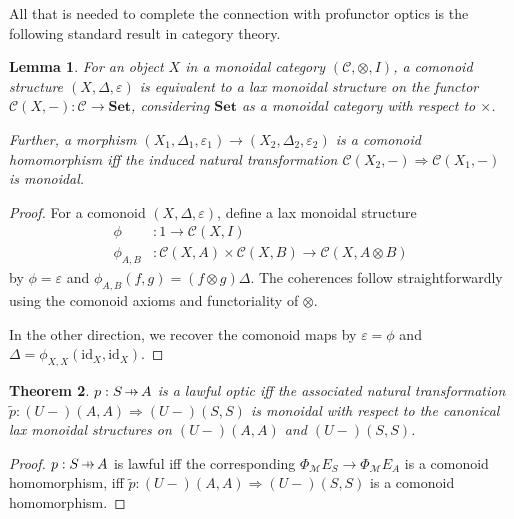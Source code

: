 \documentclass[11pt,letterpaper]{article}
\theoremstyle{plain}
\newtheorem{theorem}{Theorem}[subsection]
\newtheorem{lemma}[theorem]{Lemma}
\theoremstyle{definition}
\newcommand{\C}{\mathscr{C}}
\newcommand{\M}{\mathscr{M}}
\newcommand{\Pastro}{\Phi}
\newcommand{\Set}{\mathbf{Set}}
\newcommand{\id}{\mathrm{id}}
\newcommand{\hto}{\ensuremath{\,\mathaccent\shortmid\rightarrow\,}}
\begin{document}
All that is needed to complete the connection with profunctor optics is the following standard result in category theory.

\begin{lemma}
  For an object $X$ in a monoidal category $(\C, \otimes, I)$, a comonoid structure $(X,\Delta,\varepsilon)$ is equivalent to a lax monoidal structure on the functor $\C(X, -) : \C \to \Set$, considering $\Set$ as a monoidal category with respect to $\times$. 
  
  Further, a morphism $(X_1,\Delta_1,\varepsilon_1) \to (X_2,\Delta_2,\varepsilon_2)$ is a comonoid homomorphism iff the induced natural transformation $\C(X_2, -) \Rightarrow \C(X_1, -)$ is monoidal.
\end{lemma}
\begin{proof}
  For a comonoid $(X,\Delta,\varepsilon)$, define a lax monoidal structure
  \begin{align*}
    \phi &: 1 \to \C(X, I) \\
    \phi_{A, B} &: \C(X, A) \times \C(X, B) \to \C(X, A \otimes B)
  \end{align*}
  by $\phi = \varepsilon$ and $\phi_{A, B}(f, g) = (f \otimes g) \Delta$. The coherences follow straightforwardly using the comonoid axioms and functoriality of $\otimes$.

  In the other direction,  we recover the comonoid maps by $\varepsilon = \phi$ and $\Delta = \phi_{X, X}(\id_X, \id_X)$.
\end{proof}

\begin{theorem}
  $p : S \hto A$ is a lawful optic iff the associated natural transformation $\tilde{p} : (U-)(A,A) \Rightarrow (U-)(S,S)$ is monoidal with respect to the canonical lax monoidal structures on $(U-)(A,A)$ and $(U-)(S,S)$.
\end{theorem}
\begin{proof}
$p : S \hto A$ is lawful iff the corresponding $\Pastro_\M E_S \to \Pastro_\M E_A$ is a comonoid homomorphism, iff $\tilde{p} : (U-)(A,A) \Rightarrow (U-)(S,S)$ is a comonoid homomorphism.
\end{proof}
\end{document}
